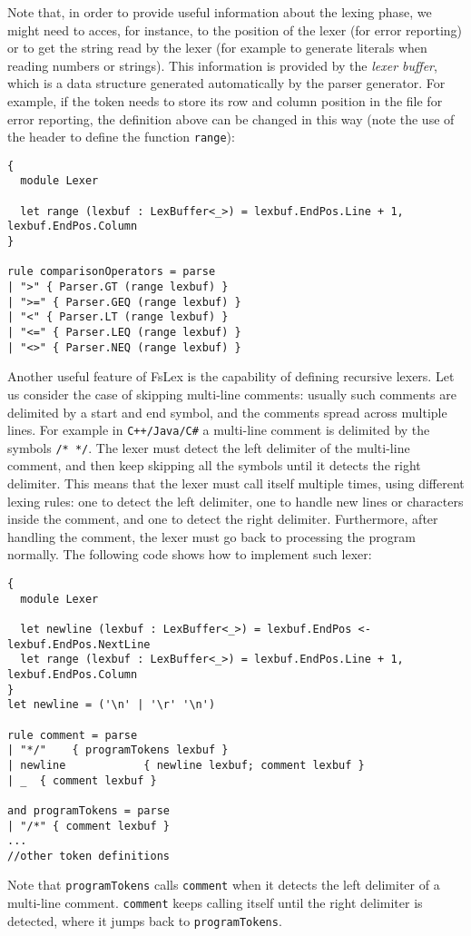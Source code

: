 Note that, in order to provide useful information about the lexing phase, we might need to acces, for instance, to the position of the lexer (for error reporting) or to get the string read by the lexer (for example to generate literals when reading numbers or strings). This information is provided by the \textit{lexer buffer}, which is a data structure generated automatically by the parser generator. For example, if the token needs to store its row and column position in the file for error reporting, the definition above can be changed in this way (note the use of the header to define the function \texttt{range}):

\begin{lstlisting}
{
  module Lexer
  
  let range (lexbuf : LexBuffer<_>) = lexbuf.EndPos.Line + 1, lexbuf.EndPos.Column
}

rule comparisonOperators = parse
| ">" { Parser.GT (range lexbuf) }
| ">=" { Parser.GEQ (range lexbuf) }
| "<" { Parser.LT (range lexbuf) }
| "<=" { Parser.LEQ (range lexbuf) }
| "<>" { Parser.NEQ (range lexbuf) }
\end{lstlisting}

Another useful feature of FsLex is the capability of defining recursive lexers. Let us consider the case of skipping multi-line comments: usually such comments are delimited by a start and end symbol, and the comments spread across multiple lines. For example in \texttt{C++/Java/C\#} a multi-line comment is delimited by the symbols \texttt{/* */}. The lexer must detect the left delimiter of the multi-line comment, and then keep skipping all the symbols until it detects the right delimiter. This means that the lexer must call itself multiple times, using different lexing rules: one to detect the left delimiter, one to handle new lines or characters inside the comment, and one to detect the right delimiter. Furthermore, after handling the comment, the lexer must go back to processing the program normally. The following code shows how to implement such lexer:

\begin{lstlisting}
{
  module Lexer
  
  let newline (lexbuf : LexBuffer<_>) = lexbuf.EndPos <- lexbuf.EndPos.NextLine
  let range (lexbuf : LexBuffer<_>) = lexbuf.EndPos.Line + 1, lexbuf.EndPos.Column
}
let newline = ('\n' | '\r' '\n')

rule comment = parse
| "*/"    { programTokens lexbuf }
| newline            { newline lexbuf; comment lexbuf }
| _  { comment lexbuf }

and programTokens = parse
| "/*" { comment lexbuf }
...
//other token definitions
\end{lstlisting}
Note that \texttt{programTokens} calls \texttt{comment} when it detects the left delimiter of a multi-line comment. \texttt{comment} keeps calling itself until the right delimiter is detected, where it jumps back to \texttt{programTokens}.

